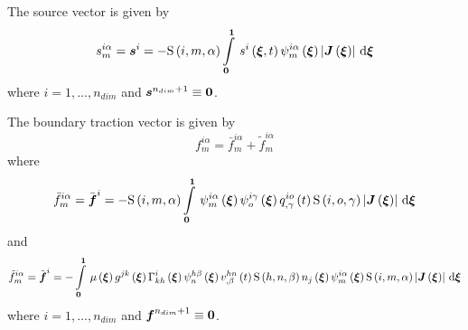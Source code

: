 The source vector is given by
\begin{equation}
  s^{i\alpha}_{m}=\vectr{s}^{i}=-\idxgsf{i}{m}{\alpha}\gint{\vectr{0}}{\vectr{1}}{\fnof{s^{i}}{\vectr{\xi},t}
      \idxgbfn{i}{m}{\alpha}{\vectr{\xi}}\abs{\fnof{\matr{J}}{\vectr{\xi}}}}{\vectr{\xi}}
\end{equation}
where $i=1,\dots,n_{dim}$ and $ \boldsymbol{s} ^{n_{dim}+1}\equiv \boldsymbol{0} $.

The boundary traction vector is given by
\begin{equation}
  f^{i\alpha}_{m}=\bar{f}^{i\alpha}_{m}+\tilde{f}^{i\alpha}_{m}
\end{equation}
where
\begin{equation}
  \bar{f}^{i\alpha}_{m}=\bar{\vectr{f}}^{i}=-\idxgsf{i}{m}{\alpha}
  \gint{\vectr{0}}{\vectr{1}}{\idxgbfn{i}{m}{\alpha}{\vectr{\xi}}\idxgbfn{i}{o}{\gamma}{\vectr{\xi}}\fnof{\idxnodedof{q}{i}{o}{\gamma}}{t}\idxgsf{i}{o}{\gamma}
    \abs{\fnof{\matr{J}}{\vectr{\xi}}}}{\vectr{\xi}}
\end{equation}
and
\begin{equation}
  \tilde{f}^{i\alpha}_{m}=\tilde{\vectr{f}}^{i}=-\gint{\vectr{0}}{\vectr{1}}{\fnof{\mu}{\vectr{\xi}}
       \fnof{g^{jk}}{\vectr{\xi}}\fnof{\christoffel{i}{k}{h}}{\vectr{\xi}}\idxgbfn{h}{n}{\beta}{\vectr{\xi}}
       \fnof{\idxnodedof{v}{h}{n}{\beta}}{t}\idxgsf{h}{n}{\beta}\fnof{n_{j}}{\vectr{\xi}}
       \idxgbfn{i}{m}{\alpha}{\vectr{\xi}}\idxgsf{i}{m}{\alpha}\abs{\fnof{\matr{J}}{\vectr{\xi}}}}{\vectr{\xi}}
\end{equation}
where $i=1,\dots,n_{dim}$ and $ \boldsymbol{f} ^{n_{dim}+1}\equiv \boldsymbol{0} $.


